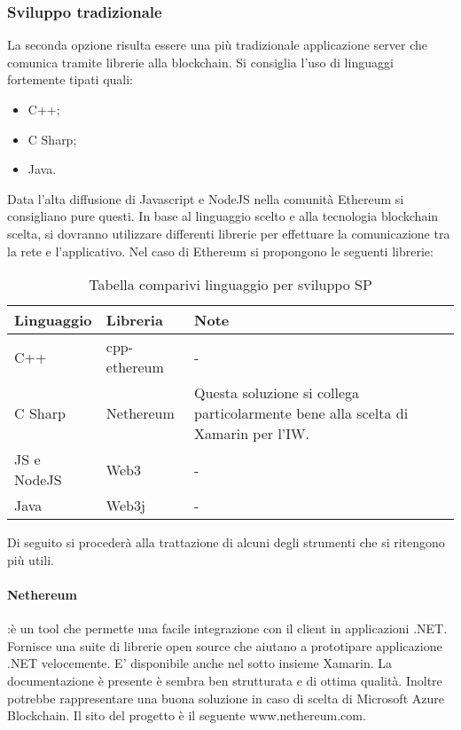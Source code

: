 \subsubsection{Sviluppo tradizionale}
La seconda opzione risulta essere una più tradizionale applicazione server che comunica tramite librerie alla blockchain. Si consiglia l’uso di linguaggi fortemente tipati quali: 
\begin{itemize}
    \item C++;
    \item C Sharp;
    \item Java.
\end{itemize}
Data l’alta diffusione di Javascript e NodeJS nella comunità Ethereum si consigliano pure questi.
In base al linguaggio scelto e alla tecnologia blockchain scelta, si dovranno utilizzare differenti librerie per effettuare la comunicazione tra la rete e l’applicativo. Nel caso di Ethereum si propongono le seguenti librerie:
\begin{table}[!h] %
    \caption{Tabella comparivi linguaggio per sviluppo SP}
    \label{tab:comp-ling}
    \begin{tabularx}{\textwidth}{|l|l|l|X|}
    \hline
    \textbf{Linguaggio} & \textbf{Libreria} & \textbf{Note}\\
    \hline
    C++   & cpp-ethereum & - \\
    \hline
    C Sharp   & Nethereum & Questa soluzione si collega particolarmente bene alla scelta di Xamarin per l’IW. \\
    \hline
    JS e NodeJS   & Web3 & -\\
    \hline
    Java  & Web3j & -\\
    \hline
    \end{tabularx}
\end{table}%

Di seguito si procederà alla trattazione di alcuni degli strumenti che si ritengono più utili.
\paragraph{Nethereum}:è un tool che permette una facile integrazione con il client in applicazioni .NET. Fornisce una suite di librerie open source che aiutano a prototipare applicazione .NET velocemente. E’ disponibile anche nel sotto insieme Xamarin.  La documentazione è presente è sembra ben strutturata e di ottima qualità. Inoltre potrebbe rappresentare una buona soluzione in caso di scelta di Microsoft Azure Blockchain. Il sito del progetto è il seguente www.nethereum.com.   
